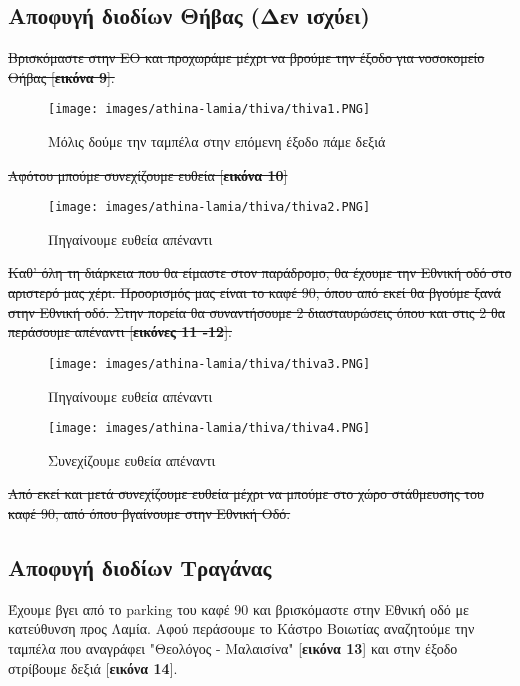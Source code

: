 \begin{center}
\section*{Αποφυγή διοδίων Θήβας (Δεν ισχύει)}
\end{center}
\sout{Βρισκόμαστε στην ΕΟ και προχωράμε μέχρι να βρούμε την έξοδο για νοσοκομείο Θήβας [\textbf{εικόνα 9}].}
\begin{figure}[hbp!]
	\centering
		\texttt{[image: images/athina-lamia/thiva/thiva1.PNG]}
			\caption{Μόλις δούμε την ταμπέλα στην επόμενη έξοδο πάμε δεξιά}
\end{figure}
\sout{Αφότου μπούμε συνεχίζουμε ευθεία [\textbf{εικόνα 10}]}
\begin{figure}[hbp!]
	\centering
		\texttt{[image: images/athina-lamia/thiva/thiva2.PNG]}
			\caption{Πηγαίνουμε ευθεία απέναντι}
\end{figure}
\newpage
\sout{Καθ' όλη τη διάρκεια που θα είμαστε στον παράδρομο, θα έχουμε την Εθνική οδό στο αριστερό μας χέρι. Προορισμός μας είναι το καφέ 90, όπου από εκεί θα βγούμε ξανά στην Εθνική οδό. Στην πορεία θα συναντήσουμε 2 διασταυρώσεις όπου και στις 2 θα περάσουμε απέναντι [\textbf{εικόνες 11 -12}]. }
\begin{figure}[hbp!]
	\centering
		\texttt{[image: images/athina-lamia/thiva/thiva3.PNG]}
			\caption{Πηγαίνουμε ευθεία απέναντι}
\end{figure}
\begin{figure}[hbp!]
	\centering
		\texttt{[image: images/athina-lamia/thiva/thiva4.PNG]}
			\caption{Συνεχίζουμε ευθεία απέναντι}
\end{figure}
\sout{Από εκεί και μετά συνεχίζουμε ευθεία μέχρι να μπούμε στο χώρο στάθμευσης του καφέ 90, από όπου βγαίνουμε στην Εθνική Οδό.}
\newpage
\begin{center}
\section*{Αποφυγή διοδίων Τραγάνας}
\end{center}
Έχουμε βγει από το parking του καφέ 90 και βρισκόμαστε στην Εθνική οδό με κατεύθυνση προς Λαμία. Αφού περάσουμε το Κάστρο Βοιωτίας αναζητούμε την ταμπέλα που αναγράφει "Θεολόγος - Μαλαισίνα" [\textbf{εικόνα 13}] και στην έξοδο στρίβουμε δεξιά [\textbf{εικόνα 14}].

